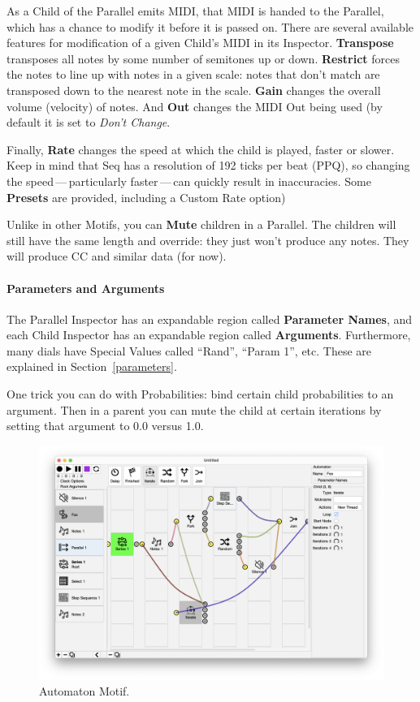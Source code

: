 \documentclass[twoside,10pt]{article}
\begin{document}
As a Child of the Parallel emits MIDI, that MIDI is handed to the Parallel, which has a chance to modify it before it is passed on.  There are several available features for modification of a given Child's MIDI in its Inspector.  {\bf Transpose} transposes all notes by some number of semitones up or down.  {\bf Restrict} forces the notes to line up with notes in a given scale: notes that don't match are transposed down to the nearest note in the scale.  {\bf Gain} changes the overall volume (velocity) of notes.  And {\bf Out} changes the MIDI Out being used (by default it is set to {\it Don't Change}.

Finally, {\bf Rate} changes the speed at which the child is played, faster or slower.  Keep in mind that Seq has a resolution of 192 ticks per beat (PPQ), so changing the speed\,---\,particularly faster\,---\,can quickly result in inaccuracies.    Some {\bf Presets} are provided, including a Custom Rate option)

Unlike in other Motifs, you can {\bf Mute} children in a Parallel.  The children will still have the same length and override: they just won't produce any notes.  They will produce CC and similar data (for now).

\paragraph{Parameters and Arguments}

The Parallel Inspector has an expandable region called {\bf Parameter Names}, and each Child Inspector has an expandable region called {\bf Arguments}. Furthermore, many dials have Special Values called ``Rand'', ``Param 1'', etc.  These are explained in Section~\ref{parameters}.

One trick you can do with Probabilities: bind certain child probabilities to an argument.  Then in a parent you can mute the child at certain iterations by setting that argument to 0.0 versus 1.0.



\clearpage

\begin{figure}[t]
\centering
\includegraphics[width=6.5in]{Automaton}
\vspace{-2em}
\caption{Automaton Motif.}
\label{automaton}
\end{figure}
\end{document}
